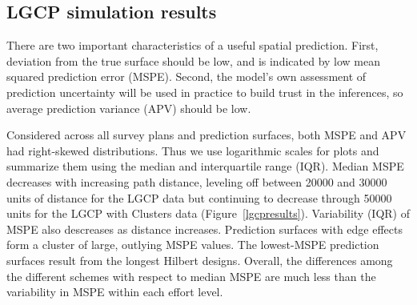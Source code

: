 \documentclass[review]{elsarticle}
\begin{document}
\subsection{LGCP simulation results}

There are two important characteristics of a useful spatial prediction. First,
deviation from the true surface should be low, and is indicated by low
mean squared prediction error (MSPE). Second, the model's own assessment of
prediction uncertainty will be used in practice to build trust in the
inferences, so average prediction variance (APV) should be low.

Considered across all survey plans and prediction surfaces, both MSPE and APV
had right-skewed distributions. Thus we use logarithmic scales for plots and
summarize them using the median and interquartile range (IQR). Median MSPE
decreases with increasing path distance, leveling off between 20000 and 30000
units of distance for the LGCP data but continuing to decrease through 50000
units for the LGCP with Clusters data (Figure~\ref{lgcpresults}). Variability
(IQR) of MSPE also descreases as distance increases. Prediction surfaces with
edge effects form a cluster of large, outlying MSPE values. The lowest-MSPE
prediction surfaces result from the longest Hilbert designs. Overall, the
differences among the different schemes with respect to median MSPE are much
less than the variability in MSPE within each effort level.



\end{document}
